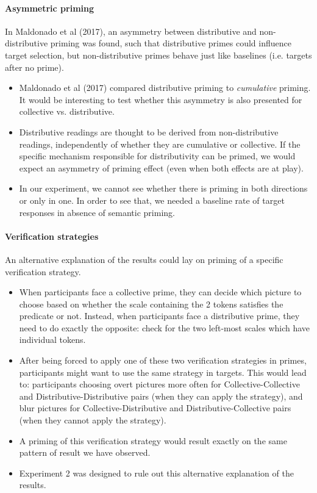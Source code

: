 \documentclass[a4paper, 11pt]{article}
\begin{document}
\paragraph{Asymmetric priming}
In Maldonado et al (2017), an asymmetry between distributive and non-distributive priming was found, such that distributive primes could influence target selection, but non-distributive primes behave just like baselines (i.e. targets after no prime). 
\begin{itemize}
\item Maldonado et al (2017) compared distributive priming to \emph{cumulative} priming. It would be interesting to test whether this asymmetry is also presented for collective vs. distributive. 

\item Distributive readings are thought to be derived from non-distributive readings, independently of whether they are cumulative or collective. If the specific mechanism responsible for distributivity can be primed, we would expect an asymmetry of priming effect (even when both effects are at play). 

\item In our experiment, we cannot see whether there is priming in both directions or only in one. In order to see that, we needed a baseline rate of target responses in absence of semantic priming.

\end{itemize}

\paragraph{Verification strategies}
An alternative explanation of the results could lay on priming of a specific verification strategy. 

\begin{itemize}

\item When participants face a collective prime, they can decide which picture to choose based on whether the scale containing the 2 tokens satisfies the predicate or not. Instead, when participants face a distributive prime, they need to do exactly the opposite: check for the two left-most scales which have individual tokens. 

\item After being forced to apply one of these two verification strategies in primes, participants might want to use the same strategy in targets. This would lead to: participants choosing overt pictures more often for Collective-Collective and Distributive-Distributive pairs (when they can apply the strategy), and blur pictures for Collective-Distributive and Distributive-Collective pairs (when they cannot apply the strategy). 

\item A priming of this verification strategy would result exactly on the same pattern of result we have observed. 

\item Experiment 2 was designed to rule out this alternative explanation of the results. 

\end{itemize}
\end{document}

